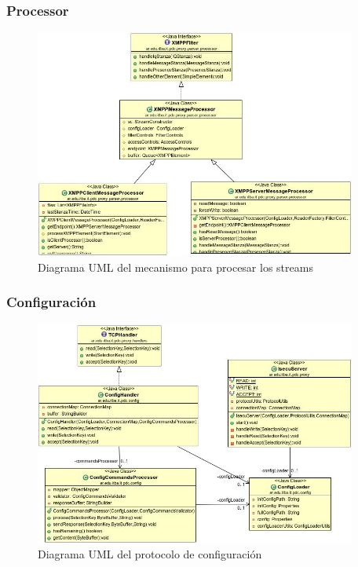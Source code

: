 \documentclass[a4paper,10pt]{article}
\begin{document}
\newpage
\subsubsection{Processor}
\begin{figure}[h]
	\centering
	\includegraphics[width=400px]{UML/Processor}  
	\caption{Diagrama UML del mecanismo para procesar los streams}
	\label{figure:Processor}
\end{figure}

\newpage
\subsubsection{Configuración}
\begin{figure}[h]
	\centering
	\includegraphics[width=400px]{UML/ConfigUML}  
	\caption{Diagrama UML del protocolo de configuración}
	\label{figure:ConfigUML}
\end{figure}
\end{document}
